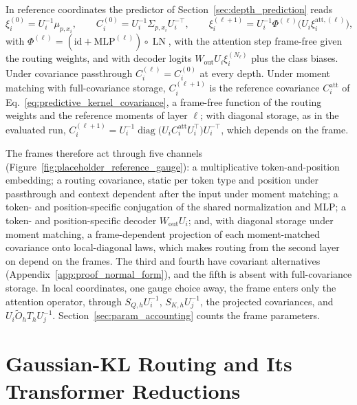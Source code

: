 \documentclass[twoside,11pt]{article}
\begin{document}
\begin{corollary}
\label{cor:normal_form}
In reference coordinates the predictor of Section~\ref{sec:depth_prediction} reads
\begin{equation}
\xi_i^{(0)}=U_i^{-1}\mu_{p,x_i},\qquad
C_i^{(0)}=U_i^{-1}\Sigma_{p,x_i}U_i^{-\top},\qquad
\xi_i^{(\ell+1)}=U_i^{-1}\Phi^{(\ell)}\bigl(U_i\xi_i^{\mathrm{att},(\ell)}\bigr),
\label{eq:reference_normal_form}
\end{equation}
with $\Phi^{(\ell)}=(\mathrm{id}+\mathrm{MLP}^{(\ell)})\circ\operatorname{LN}$, with the attention step frame-free given the routing weights, and with decoder logits $W_{\mathrm{out}}U_i\xi_i^{(N_\ell)}$ plus the class biases. Under covariance passthrough $C_i^{(\ell)}=C_i^{(0)}$ at every depth. Under moment matching with full-covariance storage, $C_i^{(\ell+1)}$ is the reference covariance $C_i^{\mathrm{att}}$ of Eq.~\eqref{eq:predictive_kernel_covariance}, a frame-free function of the routing weights and the reference moments of layer $\ell$; with diagonal storage, as in the evaluated run, $C_i^{(\ell+1)}=U_i^{-1}\operatorname{diag}\bigl(U_iC_i^{\mathrm{att}}U_i^\top\bigr)U_i^{-\top}$, which depends on the frame.
\end{corollary}
The frames therefore act through five channels (Figure~\ref{fig:placeholder_reference_gauge}): a multiplicative token-and-position embedding; a routing covariance, static per token type and position under passthrough and context dependent after the input under moment matching; a token- and position-specific conjugation of the shared normalization and MLP; a token- and position-specific decoder $W_{\mathrm{out}}U_i$; and, with diagonal storage under moment matching, a frame-dependent projection of each moment-matched covariance onto local-diagonal laws, which makes routing from the second layer on depend on the frames. The third and fourth have covariant alternatives (Appendix~\ref{app:proof_normal_form}), and the fifth is absent with full-covariance storage. In local coordinates, one gauge choice away, the frame enters only the attention operator, through $S_{Q,h}U_i^{-1}$, $S_{K,h}U_j^{-1}$, the projected covariances, and $U_i\widetilde O_hT_hU_j^{-1}$. Section~\ref{sec:param_accounting} counts the frame parameters.



\section{Gaussian-KL Routing and Its Transformer Reductions}
\label{sec:transformer_comparison_summary}
\end{document}
